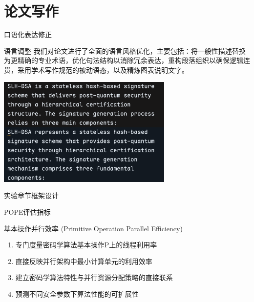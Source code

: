 \documentclass{beamer}
\begin{document}
\section{论文写作}
\begin{frame}{口语化表达修正}
  \begin{block}{语言调整}
    我们对论文进行了全面的语言风格优化，主要包括：将一般性描述替换为更精确的专业术语，优化句法结构以消除冗余表达，重构段落组织以确保逻辑连贯，采用学术写作规范的被动语态，以及精炼图表说明文字。
  \end{block}

  \begin{center}
    \includegraphics[width=0.65\textwidth]{./fig/fix_writing.png}
  \end{center}
\end{frame}

\begin{frame}{实验章节框架设计}
  \begin{seqpara}
  \end{seqpara}
\end{frame}

\begin{frame}{POPE评估指标}
  \begin{block}{基本操作并行效率 (Primitive Operation Parallel Efficiency)}
    \begin{enumerate}
      \item 专门度量密码学算法基本操作P上的线程利用率
      \item 直接反映并行架构中最小计算单元的利用效率
      \item 建立密码学算法特性与并行资源分配策略的直接联系
      \item 预测不同安全参数下算法性能的可扩展性
    \end{enumerate}
  \end{block}
\end{frame}
\end{document}
